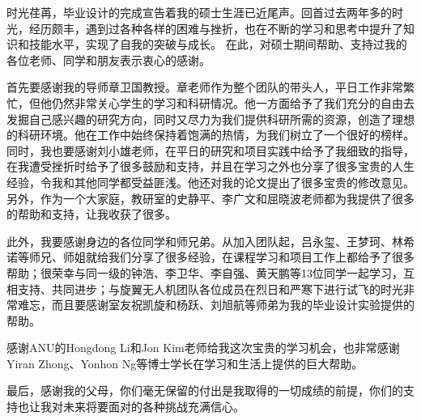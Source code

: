 
时光荏苒，毕业设计的完成宣告着我的硕士生涯已近尾声。回首过去两年多的时光，经历颇丰，遇到过各种各样的困难与挫折，也在不断的学习和思考中提升了知识和技能水平，实现了自我的突破与成长。
在此，对硕士期间帮助、支持过我的各位老师、同学和朋友表示衷心的感谢。

首先要感谢我的导师章卫国教授。章老师作为整个团队的带头人，平日工作非常繁忙，但他仍然非常关心学生的学习和科研情况。他一方面给予了我们充分的自由去发掘自己感兴趣的研究方向，同时又尽力为我们提供科研所需的资源，创造了理想的科研环境。他在工作中始终保持着饱满的热情，为我们树立了一个很好的榜样。
同时，我也要感谢刘小雄老师，在平日的研究和项目实践中给予了我细致的指导，在我遭受挫折时给予了很多鼓励和支持，并且在学习之外也分享了很多宝贵的人生经验，令我和其他同学都受益匪浅。他还对我的论文提出了很多宝贵的修改意见。另外，作为一个大家庭，教研室的史静平、李广文和屈晓波老师都为我提供了很多的帮助和支持，让我收获了很多。

此外，我要感谢身边的各位同学和师兄弟。从加入团队起，吕永玺、王梦珂、林希诺等师兄、师姐就给我们分享了很多经验，在课程学习和项目工作上都给予了很多帮助；很荣幸与同一级的钟浩、李卫华、李自强、黄天鹏等13位同学一起学习，互相支持、共同进步；与旋翼无人机团队各位成员在烈日和严寒下进行试飞的时光非常难忘，而且要感谢室友祝凯旋和杨跃、刘旭航等师弟为我的毕业设计实验提供的帮助。

感谢ANU的Hongdong Li和Jon Kim老师给我这次宝贵的学习机会，也非常感谢Yiran Zhong、Yonhon Ng等博士学长在学习和生活上提供的巨大帮助。

最后，感谢我的父母，你们毫无保留的付出是我取得的一切成绩的前提，你们的支持也让我对未来将要面对的各种挑战充满信心。